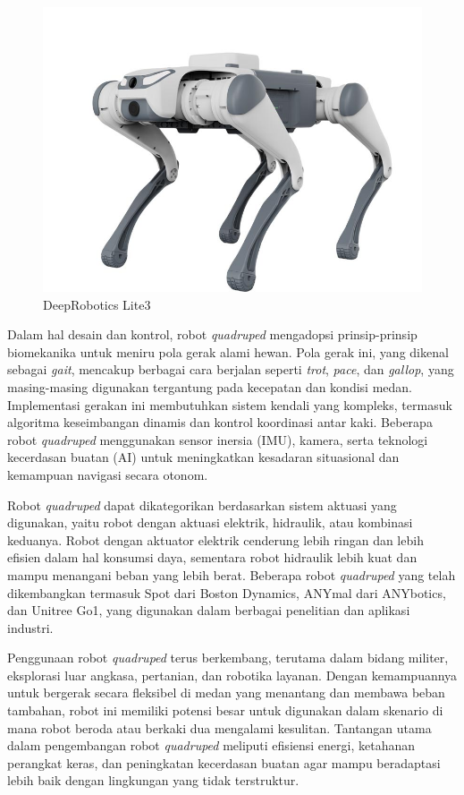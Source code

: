 \begin{figure} [H] \centering
  \includegraphics[scale=0.25]{gambar/quadruped_robot.jpg}
  \caption{DeepRobotics Lite3}
  \label{fig:quadruped_robot}
\end{figure}

Dalam hal desain dan kontrol, robot \emph{quadruped} mengadopsi prinsip-prinsip biomekanika
untuk meniru pola gerak alami hewan. Pola gerak ini, yang dikenal sebagai \emph{gait},
mencakup berbagai cara berjalan seperti \emph{trot}, \emph{pace}, dan \emph{gallop},
yang masing-masing digunakan tergantung pada kecepatan dan kondisi medan.
Implementasi gerakan ini membutuhkan sistem kendali yang kompleks,
termasuk algoritma keseimbangan dinamis dan kontrol koordinasi antar kaki.
Beberapa robot \emph{quadruped} menggunakan sensor inersia (IMU), kamera,
serta teknologi kecerdasan buatan (AI) untuk meningkatkan kesadaran situasional dan kemampuan navigasi secara otonom.

Robot \emph{quadruped} dapat dikategorikan berdasarkan sistem aktuasi yang digunakan,
yaitu robot dengan aktuasi elektrik, hidraulik, atau kombinasi keduanya.
Robot dengan aktuator elektrik cenderung lebih ringan dan lebih efisien dalam hal konsumsi daya,
sementara robot hidraulik lebih kuat dan mampu menangani beban yang lebih berat.
Beberapa robot \emph{quadruped} yang telah dikembangkan termasuk Spot dari Boston Dynamics,
ANYmal dari ANYbotics, dan Unitree Go1, yang digunakan dalam berbagai penelitian dan aplikasi industri.

Penggunaan robot \emph{quadruped} terus berkembang, terutama dalam bidang militer, eksplorasi luar angkasa,
pertanian, dan robotika layanan. Dengan kemampuannya untuk bergerak secara fleksibel di medan yang menantang
dan membawa beban tambahan, robot ini memiliki potensi besar untuk digunakan dalam
skenario di mana robot beroda atau berkaki dua mengalami kesulitan.
Tantangan utama dalam pengembangan robot \emph{quadruped} meliputi efisiensi energi, ketahanan perangkat keras,
dan peningkatan kecerdasan buatan agar mampu beradaptasi lebih baik dengan lingkungan yang tidak terstruktur.


